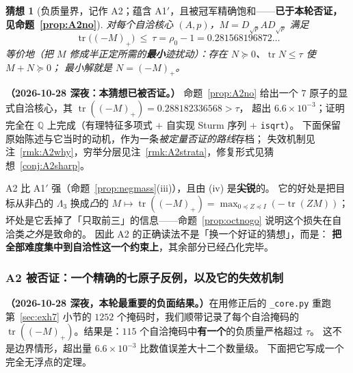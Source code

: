 \documentclass[UTF8,11pt]{ctexart}
\newtheorem{conjecture}[theorem]{猜想}
\theoremstyle{definition}
\newcommand{\Lam}{\Lambda}
\newcommand{\tr}{\operatorname{tr}}
\newcommand{\Q}{\mathbb{Q}}
\begin{document}
\begin{conjecture}[负质量界，记作 A2；蕴含 A1$'$，且被冠军精确饱和——\textbf{已于本轮否证，见命题~\ref{prop:A2no}}]\label{conj:A2}
对每个自洽核心 $(A,p)$，$M=D_{\sqrt p}AD_{\sqrt p}$ 满足
\[
\tr\bigl((-M)_+\bigr)\ \le\ \tau=\rho_0-1=0.281568196872\ldots
\]
等价地（把 $M$ 修成半正定所需的\textbf{最小}迹扰动）：存在 $N\succeq0$、$\tr N\le\tau$ 使 $M+N\succeq0$；
最小解就是 $N=(-M)_+$。
\end{conjecture}

\noindent\textbf{（2026-10-28 深夜：本猜想已被否证。）}
命题~\ref{prop:A2no} 给出一个 $7$ 原子的显式自洽核心，其 $\tr((-M)_+)=0.288182336568>\tau$，
超出 $6.6\times10^{-3}$；证明完全在 $\Q$ 上完成（有理特征多项式 $+$ 自实现 Sturm 序列 $+$ \texttt{isqrt}）。
下面保留原始陈述与它当时的动机，作为一条\emph{被定量否证的路线}存档；
失效机制见注~\ref{rmk:A2why}，穷举分层见注~\ref{rmk:A2strata}，修复形式见猜想~\ref{conj:A2sharp}。

\medskip
A2 比 A1$'$ 强（命题~\ref{prop:negmass}(iii)），且由 (iv) 是\textbf{尖锐}的。
它的好处是把目标从非凸的 $\Lam_3$ 换成\emph{凸}的 $M\mapsto\tr((-M)_+)=\max_{0\preceq Z\preceq I}(-\tr(ZM))$；
坏处是它丢掉了「只取前三」的信息——命题~\ref{prop:octnogo} 说明这个损失在自洽类\emph{之外}是致命的。
因此 A2 的正确读法不是「换一个好证的猜想」，而是：
\textbf{把全部难度集中到自洽性这一个约束上}，其余部分已经凸化完毕。

\subsubsection{A2 被否证：一个精确的七原子反例，以及它的失效机制}\label{sec:A2no}

\textbf{（2026-10-28 深夜，本轮最重要的负面结果。）}在用修正后的 \texttt{\_core.py}
重跑第~\ref{sec:exh7} 小节的 $1252$ 个掩码时，我们顺带记录了每个自洽掩码的
$\tr((-M)_+)$。结果是：$115$ 个自洽掩码中\textbf{有一个}的负质量严格超过 $\tau$。
这不是边界情形，超出量 $6.6\times10^{-3}$ 比数值误差大十二个数量级。
下面把它写成一个完全无浮点的定理。
\end{document}
